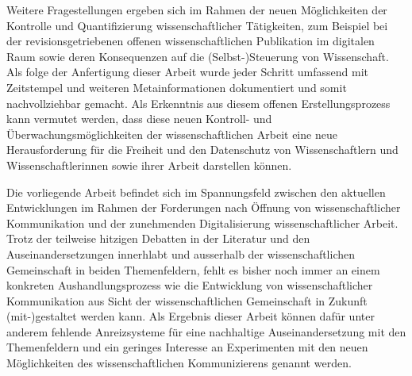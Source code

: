 Weitere Fragestellungen ergeben sich im Rahmen der neuen Möglichkeiten der Kontrolle und Quantifizierung wissenschaftlicher Tätigkeiten, zum Beispiel bei der revisionsgetriebenen offenen wissenschaftlichen Publikation im digitalen Raum sowie deren Konsequenzen auf die (Selbst-)Steuerung von Wissenschaft. Als folge der Anfertigung dieser Arbeit wurde jeder Schritt umfassend mit Zeitstempel und weiteren Metainformationen dokumentiert und somit nachvollziehbar gemacht. Als Erkenntnis aus diesem offenen Erstellungsprozess kann vermutet werden, dass diese neuen Kontroll- und Überwachungsmöglichkeiten der wissenschaftlichen Arbeit eine neue Herausforderung für die Freiheit und den Datenschutz von Wissenschaftlern und Wissenschaftlerinnen sowie ihrer Arbeit darstellen können.

Die vorliegende Arbeit befindet sich im Spannungsfeld zwischen den aktuellen Entwicklungen im Rahmen der Forderungen nach Öffnung von wissenschaftlicher Kommunikation und der zunehmenden Digitalisierung wissenschaftlicher Arbeit. Trotz der teilweise hitzigen Debatten in der Literatur und den Auseinandersetzungen innerhlabt und ausserhalb der wissenschaftlichen Gemeinschaft in beiden Themenfeldern, fehlt es bisher noch immer an einem konkreten Aushandlungsprozess wie die Entwicklung von wissenschaftlicher Kommunikation aus Sicht der wissenschaftlichen Gemeinschaft in Zukunft (mit-)gestaltet werden kann. Als Ergebnis dieser Arbeit können dafür unter anderem fehlende Anreizsysteme für eine nachhaltige Auseinandersetzung mit den Themenfeldern und ein geringes Interesse an Experimenten mit den neuen Möglichkeiten des wissenschaftlichen Kommunizierens genannt werden.
